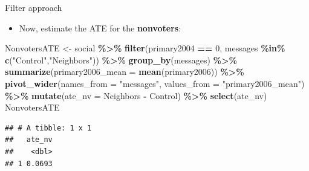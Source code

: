 \documentclass[
  ignorenonframetext,
]{beamer}
\newenvironment{Shaded}{\begin{snugshade}}{\end{snugshade}}
\newcommand{\AttributeTok}[1]{\textcolor[rgb]{0.13,0.29,0.53}{#1}}
\newcommand{\DecValTok}[1]{\textcolor[rgb]{0.00,0.00,0.81}{#1}}
\newcommand{\FunctionTok}[1]{\textcolor[rgb]{0.13,0.29,0.53}{\textbf{#1}}}
\newcommand{\NormalTok}[1]{#1}
\newcommand{\OtherTok}[1]{\textcolor[rgb]{0.56,0.35,0.01}{#1}}
\newcommand{\SpecialCharTok}[1]{\textcolor[rgb]{0.81,0.36,0.00}{\textbf{#1}}}
\newcommand{\StringTok}[1]{\textcolor[rgb]{0.31,0.60,0.02}{#1}}
\providecommand{\tightlist}{%
  \setlength{\itemsep}{0pt}\setlength{\parskip}{0pt}}
\begin{document}
\begin{frame}[fragile]{Filter approach}
\label{filter-approach}
\begin{itemize}
\tightlist
\item
  Now, estimate the ATE for the \textbf{nonvoters}: \pause
\end{itemize}

\footnotesize

\begin{Shaded}
\begin{Highlighting}[]
\NormalTok{NonvotersATE }\OtherTok{\textless{}{-}}\NormalTok{ social }\SpecialCharTok{\%\textgreater{}\%}
  \FunctionTok{filter}\NormalTok{(primary2004 }\SpecialCharTok{==} \DecValTok{0}\NormalTok{,}
\NormalTok{         messages }\SpecialCharTok{\%in\%} \FunctionTok{c}\NormalTok{(}\StringTok{"Control"}\NormalTok{,}\StringTok{"Neighbors"}\NormalTok{)) }\SpecialCharTok{\%\textgreater{}\%}
  \FunctionTok{group\_by}\NormalTok{(messages) }\SpecialCharTok{\%\textgreater{}\%}
  \FunctionTok{summarize}\NormalTok{(}\AttributeTok{primary2006\_mean =} \FunctionTok{mean}\NormalTok{(primary2006)) }\SpecialCharTok{\%\textgreater{}\%}
  \FunctionTok{pivot\_wider}\NormalTok{(}\AttributeTok{names\_from =} \StringTok{"messages"}\NormalTok{,}
              \AttributeTok{values\_from =} \StringTok{"primary2006\_mean"}\NormalTok{) }\SpecialCharTok{\%\textgreater{}\%}
  \FunctionTok{mutate}\NormalTok{(}\AttributeTok{ate\_nv =}\NormalTok{ Neighbors }\SpecialCharTok{{-}}\NormalTok{ Control) }\SpecialCharTok{\%\textgreater{}\%}
  \FunctionTok{select}\NormalTok{(ate\_nv)}
\NormalTok{NonvotersATE}
\end{Highlighting}
\end{Shaded}

\begin{verbatim}
## # A tibble: 1 x 1
##   ate_nv
##    <dbl>
## 1 0.0693
\end{verbatim}
\end{frame}
\end{document}
